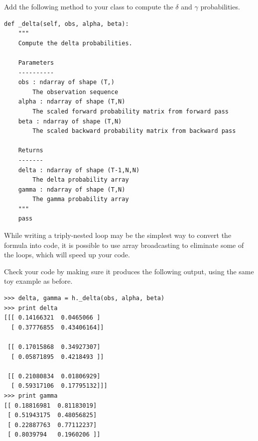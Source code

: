 \begin{problem}
Add the following method to your class to compute the $\delta$ and $\gamma$ probabilities.
\begin{lstlisting}
def _delta(self, obs, alpha, beta):
    """
    Compute the delta probabilities.

    Parameters
    ----------
    obs : ndarray of shape (T,)
        The observation sequence
    alpha : ndarray of shape (T,N)
        The scaled forward probability matrix from forward pass
    beta : ndarray of shape (T,N)
        The scaled backward probability matrix from backward pass

    Returns
    -------
    delta : ndarray of shape (T-1,N,N)
        The delta probability array
    gamma : ndarray of shape (T,N)
        The gamma probability array
    """
    pass
\end{lstlisting}
While writing a triply-nested loop may be the simplest way to convert the formula into code,
it is possible to use array broadcasting to eliminate some of the loops, which will speed up your code.

Check your code by making sure it produces the following output, using the same toy example as before.
\begin{lstlisting}
>>> delta, gamma = h._delta(obs, alpha, beta)
>>> print delta
[[[ 0.14166321  0.0465066 ]
  [ 0.37776855  0.43406164]]

 [[ 0.17015868  0.34927307]
  [ 0.05871895  0.4218493 ]]

 [[ 0.21080834  0.01806929]
  [ 0.59317106  0.17795132]]]
>>> print gamma
[[ 0.18816981  0.81183019]
 [ 0.51943175  0.48056825]
 [ 0.22887763  0.77112237]
 [ 0.8039794   0.1960206 ]]
\end{lstlisting}
\end{problem}

